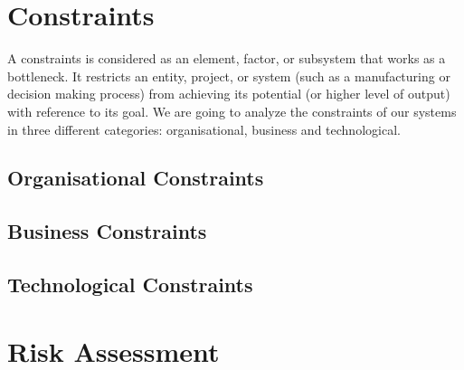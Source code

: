 \section{Constraints}

A constraints is \cite{web:bus-doc} considered as an element, factor, or subsystem that works as a bottleneck. It restricts an entity, project, or system (such as a manufacturing or decision making process) from achieving its potential (or higher level of output) with reference to its goal. We are going to analyze the constraints of our systems in three different categories: organisational, business and technological.

\subsection{Organisational Constraints}
\subsection{Business Constraints}
\subsection{Technological Constraints}

\section{Risk Assessment}

